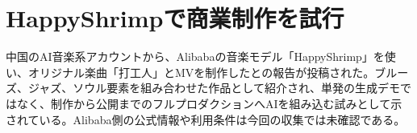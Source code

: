 \section{HappyShrimpで商業制作を試行}
中国のAI音楽系アカウントから、Alibabaの音楽モデル「HappyShrimp」を使い、オリジナル楽曲「打工人」とMVを制作したとの報告が投稿された。ブルーズ、ジャズ、ソウル要素を組み合わせた作品として紹介され、単発の生成デモではなく、制作から公開までのフルプロダクションへAIを組み込む試みとして示されている。Alibaba側の公式情報や利用条件は今回の収集では未確認である。
